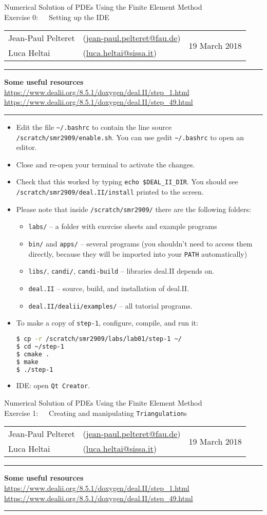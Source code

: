 \documentclass[11pt,answers]{exam}
\makeatletter
\newcommand{\makeheader}[3]{%
\setcounter{question}{0}
\begin{center}
{\sc Numerical Solution of PDEs Using the Finite Element Method}\vspace{2ex}\\
{\sc Exercise #1:\ \ \ #2}\vspace{2ex}\\
\begin{tabular*}{\textwidth}{ll @{\extracolsep{\fill}}r}
Jean-Paul Pelteret & (\url{jean-paul.pelteret@fau.de}) & \multirow{2}{*}{#3} \\
Luca Heltai & (\url{luca.heltai@sissa.it}) & \\
\end{tabular*}
\end{center}
}
\newcommand{\makeresources}[1]{%
\rule{\textwidth}{0.6mm}
\textbf{Some useful resources}\\[1.5ex]
#1 \par
\rule{\textwidth}{0.6mm}
}
\makeatother
\begin{document}

\clearpage
\makeheader{0}{Setting up the IDE}{19 March 2018}
\makeresources{%
\url{https://www.dealii.org/8.5.1/doxygen/deal.II/step_1.html} \\
\url{https://www.dealii.org/8.5.1/doxygen/deal.II/step_49.html}
}

\begin{itemize}
\item Edit the file \verb|~/.bashrc| to contain the line source \verb|/scratch/smr2909/enable.sh|. 
You can use gedit \verb|~/.bashrc| to open an editor. 
\item Close and re-open your terminal to activate the changes.
\item Check that this worked by typing \verb|echo $DEAL_II_DIR|. 
 You should see\\\verb|/scratch/smr2909/deal.II/install| printed to the screen.
\item Please note that inside \verb|/scratch/smr2909/| there are the following folders:
\begin{itemize}
\item \verb|labs/| -- a folder with exercise sheets and example programs
\item \verb|bin/| and \verb|apps/| -- several programs (you shouldn't need to access them directly, because they will be imported into your \verb|PATH| automatically)
\item \verb|libs/|, \verb|candi/|, \verb|candi-build| -- libraries deal.II depends on.
\item \verb|deal.II| -- source, build, and installation of deal.II.
\item \verb|deal.II/dealii/examples/| -- all tutorial programs.
\end{itemize}
\item To make a copy of \verb|step-1|, configure, compile, and run it:
\begin{lstlisting}[language=bash]
$ cp -r /scratch/smr2909/labs/lab01/step-1 ~/
$ cd ~/step-1
$ cmake .
$ make
$ ./step-1
\end{lstlisting}
\item  IDE: open \verb|Qt Creator|.
\end{itemize}




\clearpage
\makeheader{1}{Creating and manipulating \texttt{Triangulation}s}{19 March 2018}
\makeresources{%
\url{https://www.dealii.org/8.5.1/doxygen/deal.II/step_1.html} \\
\url{https://www.dealii.org/8.5.1/doxygen/deal.II/step_49.html}
}
\end{document}
